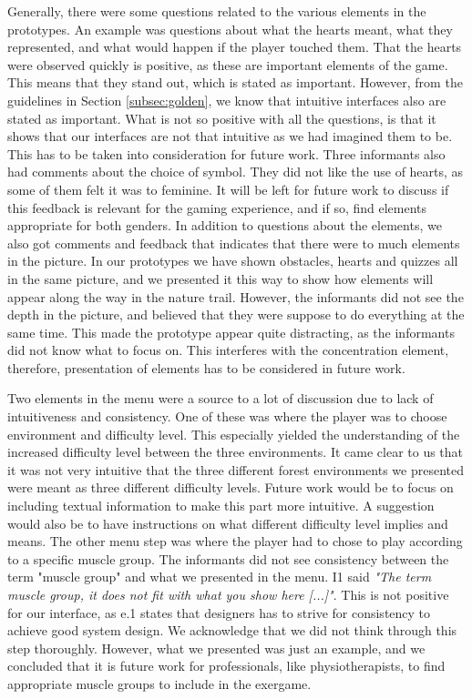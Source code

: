 Generally, there were some questions related to the various elements in the prototypes. An example was questions about what the hearts meant, what they represented, and what would happen if the player touched them. That the hearts were observed quickly is positive, as these are important elements of the game. This means that they stand out, which is stated as important. However, from the guidelines in Section \ref{subsec:golden}, we know that intuitive interfaces also are stated as important. What is not so positive with all the questions, is that it shows that our interfaces are not that intuitive as we had imagined them to be. This has to be taken into consideration for future work. Three informants also had comments about the choice of symbol. They did not like the use of hearts, as some of them felt it was to feminine. It will be left for future work to discuss if this feedback is relevant for the gaming experience, and if so, find elements appropriate for both genders. In addition to questions about the elements, we also got comments and feedback that indicates that there were to much elements in the picture. In our prototypes we have shown obstacles, hearts and quizzes all in the same picture, and we presented it this way to show how elements will appear along the way in the nature trail. However, the informants did not see the depth in the picture, and believed that they were suppose to do everything at the same time. This made the prototype appear quite distracting, as the informants did not know what to focus on. This interferes with the concentration element, therefore, presentation of elements has to be considered in future work. 

Two elements in the menu were a source to a lot of discussion due to lack of intuitiveness and consistency. One of these was where the player was to choose environment and difficulty level. This especially yielded the understanding of the increased difficulty level between the three environments. It came clear to us that it was not very intuitive that the three different forest environments we presented were meant as three different difficulty levels. Future work would be to focus on including textual information to make this part more intuitive. A suggestion would also be to have instructions on what different difficulty level implies and means. The other menu step was where the player had to chose to play according to a specific muscle group. The informants did not see consistency between the term "muscle group" and what we presented in the menu. I1 said \emph{"The term muscle group, it does not fit with what you show here [...]"}. This is not positive for our interface, as e.1 states that designers has to strive for consistency to achieve good system design. We acknowledge that we did not think through this step thoroughly. However, what we presented was just an example, and we concluded that it is future work for professionals, like physiotherapists, to find appropriate muscle groups to include in the exergame.

